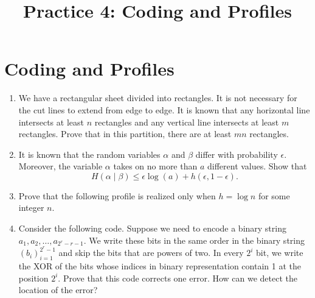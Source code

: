 \documentclass[a4paper]{article}
\title{Practice 4: Coding and Profiles}
\date{\DTMdate{2024-11-05}}
\author{}
\begin{document}
\maketitle

\section*{Coding and Profiles}

\begin{enumerate}

\item We have a rectangular sheet divided into rectangles. It is not necessary for the cut lines to extend from edge to edge. It is known that any horizontal line intersects at least $n$ rectangles and any vertical line intersects at least $m$ rectangles. Prove that in this partition, there are at least $mn$ rectangles.

\item It is known that the random variables $\alpha$ and $\beta$ differ with probability $\epsilon$. Moreover, the variable $\alpha$ takes on no more than $a$ different values. Show that
$$H(\alpha \mid \beta) \leq \epsilon \log(a) + h(\epsilon, 1-\epsilon).$$

\item Prove that the following profile is realized only when $h = \log n$ for some integer $n$.
    \begin{center}
    \end{center}

\item Consider the following code. Suppose we need to encode a binary string $a_1, a_2, \dots, a_{2^r-r-1}$. We write these bits in the same order in the binary string $(b_i)_{i=1}^{2^r-1}$ and skip the bits that are powers of two. In every $2^i$ bit, we write the XOR of the bits whose indices in binary representation contain 1 at the position $2^i$. Prove that this code corrects one error. How can we detect the location of the error?



\end{enumerate}
\end{document}

